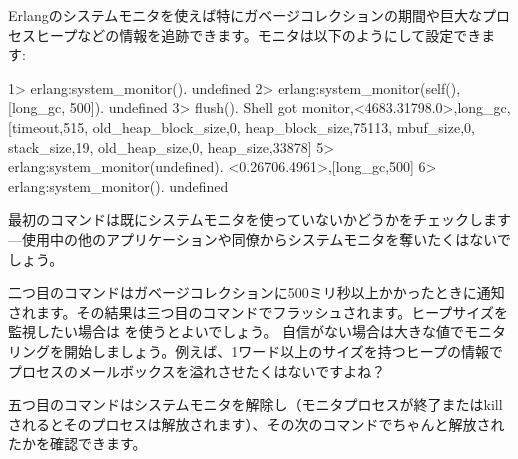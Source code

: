 Erlangのシステムモニタを使えば特にガベージコレクションの期間や巨大なプロセスヒープなどの情報を追跡できます。モニタは以下のようにして設定できます:

\begin{VerbatimEshell}
1> erlang:system_monitor().
undefined
2> erlang:system_monitor(self(), [{long_gc, 500}]).
undefined
3> flush().
Shell got {monitor,<4683.31798.0>,long_gc,
                   [{timeout,515},
                    {old_heap_block_size,0},
                    {heap_block_size,75113},
                    {mbuf_size,0},
                    {stack_size,19},
                    {old_heap_size,0},
                    {heap_size,33878}]}
5> erlang:system_monitor(undefined).
{<0.26706.4961>,[{long_gc,500}]}
6> erlang:system_monitor().
undefined
\end{VerbatimEshell}

最初のコマンドは既にシステムモニタを使っていないかどうかをチェックします---使用中の他のアプリケーションや同僚からシステムモニタを奪いたくはないでしょう。

二つ目のコマンドはガベージコレクションに500ミリ秒以上かかったときに通知されます。その結果は三つ目のコマンドでフラッシュされます。ヒープサイズを監視したい場合は  を使うとよいでしょう。
自信がない場合は大きな値でモニタリングを開始しましょう。例えば、1ワード以上のサイズを持つヒープの情報でプロセスのメールボックスを溢れさせたくはないですよね？

五つ目のコマンドはシステムモニタを解除し（モニタプロセスが終了またはkillされるとそのプロセスは解放されます）、その次のコマンドでちゃんと解放されたかを確認できます。

